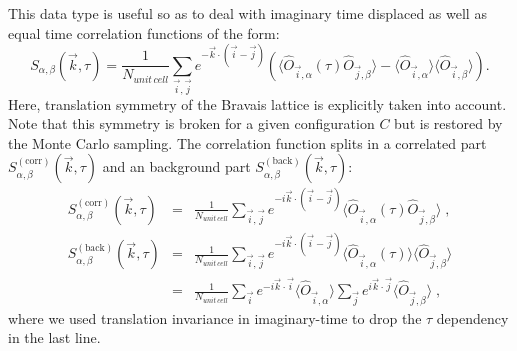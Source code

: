 This data type is useful so as to deal with  imaginary time displaced as well as equal time correlation functions of the form: 
\begin{equation}
	S_{\alpha,\beta}(\vec{k},\tau) =   \frac{1}{N_{unit\, cell }} \sum_{\vec{i},\vec{j}}  e^{- \vec{k} \cdot \left( \vec{i}-\vec{j}\right) } \left( \langle \hat{O}_{\vec{i},\alpha} (\tau) \hat{O}_{\vec{j},\beta} \rangle  - 
	  \langle \hat{O}_{\vec{i},\alpha} \rangle \langle   \hat{O}_{\vec{i},\beta}  \rangle \right).
\end{equation}
Here,  translation symmetry of the Bravais lattice is explicitly taken into account. Note that this symmetry is broken  for a given  configuration $C$ but is restored by the Monte Carlo sampling. 
The correlation function splits in a correlated part $S_{\alpha,\beta}^{\mathrm{(corr)}}(\vec{k},\tau)$ and an background part $S_{\alpha,\beta}^{\mathrm{(back)}}(\vec{k},\tau)$:
\begin{eqnarray}
  S_{\alpha,\beta}^{\mathrm{(corr)}}(\vec{k},\tau)
  &=&
   \frac{1}{N_{unit\, cell }} \sum_{\vec{i},\vec{j}}  e^{- i\vec{k} \cdot \left( \vec{i}-\vec{j}\right) }  \langle \hat{O}_{\vec{i},\alpha} (\tau) \hat{O}_{\vec{j},\beta} \rangle\;,\\
   S_{\alpha,\beta}^{\mathrm{(back)}}(\vec{k},\tau)
  &=&
   \frac{1}{N_{unit\, cell }} \sum_{\vec{i},\vec{j}}  e^{- i\vec{k} \cdot \left( \vec{i}-\vec{j}\right) }  \langle \hat{O}_{\vec{i},\alpha} (\tau)\rangle \langle \hat{O}_{\vec{j},\beta} \rangle\\\nonumber
  &=& 
   \frac{1}{N_{unit\, cell }} \sum_{\vec{i}}  e^{- i\vec{k} \cdot \vec{i} }  \langle \hat{O}_{\vec{i},\alpha}\rangle
   \sum_{\vec{j}}    e^{i\vec{k} \cdot  \vec{j} }    \langle \hat{O}_{\vec{j},\beta} \rangle\;,
\end{eqnarray}
where we used translation invariance in imaginary-time to drop the $\tau$ dependency in the last line. 

